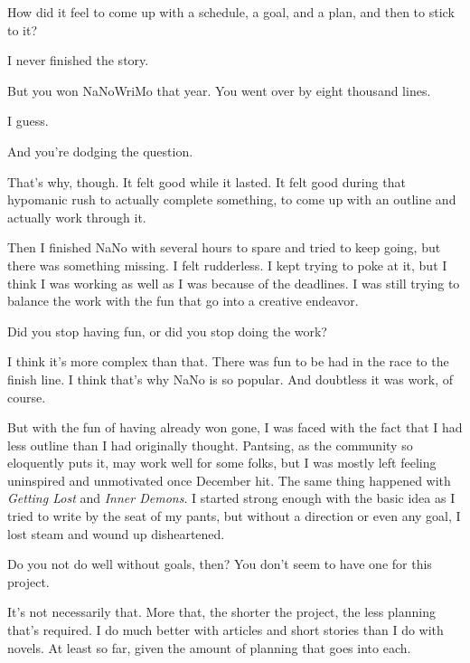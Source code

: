\begin{ally}
How did it feel to come up with a schedule, a goal, and a plan, and then to stick to it?
\end{ally}
I never finished the story.

\begin{ally}
But you won NaNoWriMo that year. You went over by eight thousand lines.
\end{ally}
I guess.

\begin{ally}
And you're dodging the question.
\end{ally}
That's why, though. It felt good while it lasted. It felt good during that hypomanic rush to actually complete something, to come up with an outline and actually work through it.

Then I finished NaNo with several hours to spare and tried to keep going, but there was something missing. I felt rudderless. I kept trying to poke at it, but I think I was working as well as I was because of the deadlines. I was still trying to balance the work with the fun that go into a creative endeavor.

\begin{ally}
Did you stop having fun, or did you stop doing the work?
\end{ally}
I think it's more complex than that. There was fun to be had in the race to the finish line. I think that's why NaNo is so popular. And doubtless it was work, of course.

But with the fun of having already won gone, I was faced with the fact that I had less outline than I had originally thought. Pantsing, as the community so eloquently puts it, may work well for some folks, but I was mostly left feeling uninspired and unmotivated once December hit. The same thing happened with \emph{Getting Lost} and \emph{Inner Demons}. I started strong enough with the basic idea as I tried to write by the seat of my pants, but without a direction or even any goal, I lost steam and wound up disheartened.

\begin{ally}
Do you not do well without goals, then? You don't seem to have one for this project.
\end{ally}
It's not necessarily that. More that, the shorter the project, the less planning that's required. I do much better with articles and short stories than I do with novels. At least so far, given the amount of planning that goes into each.

